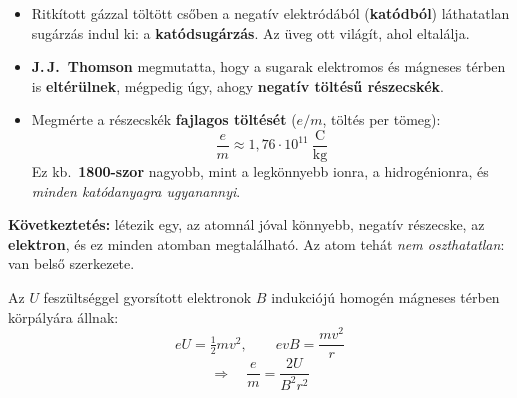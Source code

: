 \documentclass[12pt]{article}
\begin{document}
\begin{minipage}[t]{0.55\linewidth}\vspace{0pt}
\begin{itemize}
  \item Ritkított gázzal töltött csőben a negatív elektródából (\textbf{katódból})
    láthatatlan sugárzás indul ki: a \textbf{katódsugárzás}. Az üveg ott világít, ahol
    eltalálja.
  \item \textbf{J.\,J.\ Thomson} megmutatta, hogy a sugarak elektromos és mágneses térben
    is \textbf{eltérülnek}, mégpedig úgy, ahogy \textbf{negatív töltésű részecskék}.
  \item Megmérte a részecskék \textbf{fajlagos töltését} ($e/m$, töltés per tömeg):
    \[ \frac{e}{m} \approx 1{,}76\cdot 10^{11}~\frac{\text{C}}{\text{kg}} \]
    Ez kb.\ \textbf{1800-szor} nagyobb, mint a legkönnyebb ionra, a hidrogénionra, és
    \emph{minden katódanyagra ugyanannyi}.
\end{itemize}
\begin{fontos}
\textbf{Következtetés:} létezik egy, az atomnál jóval könnyebb, negatív részecske, az
\textbf{elektron}, és ez minden atomban megtalálható. Az atom tehát \emph{nem
oszthatatlan}: van belső szerkezete.
\end{fontos}
\end{minipage}\hfill
\begin{minipage}[t]{0.42\linewidth}\vspace{0pt}\centering
{}

\vspace{6pt}
\begin{pelda}[title=Iskolai mérés: fonalsugárcső]
Az $U$ feszültséggel gyorsított elektronok $B$ indukciójú homogén mágneses térben körpályára
állnak:
\[ eU = \tfrac12 mv^2, \qquad evB = \frac{mv^2}{r} \]
\[ \Longrightarrow\quad \frac{e}{m} = \frac{2U}{B^2r^2} \]
\end{pelda}
\end{minipage}
\end{document}

